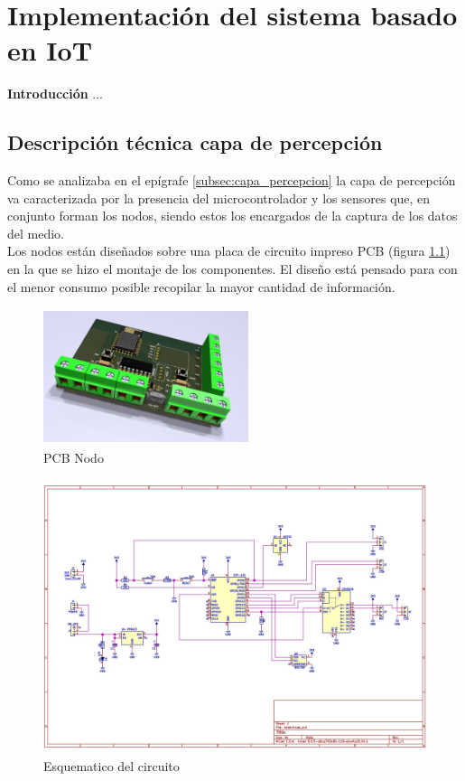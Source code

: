 \chapter{Implementación del sistema basado en IoT}\label{cap: }

        \textbf{\Large Introducción}\newline
        ...

\section{Descripción técnica capa de percepción}

Como se analizaba en el epígrafe \ref{subsec:capa_percepcion} la capa de percepción va caracterizada por la presencia del microcontrolador y los sensores que, en conjunto forman los nodos, siendo estos los
encargados de la captura de los datos del medio.\\

Los nodos están diseñados sobre una placa de circuito impreso PCB (figura \ref{imag:pcb_nodo}) en la que se hizo el montaje de los componentes.
El diseño está pensado para con el menor consumo posible recopilar la mayor cantidad de información.

\begin{figure}[H]
    \centering
    \includegraphics[width=6cm, height=4cm]{imagenes/vista 3D.jpg}
    \caption{PCB Nodo}
    \label{imag:pcb_nodo}
\end{figure}

\begin{figure}[H]
    \centering
    \includegraphics[width=12cm, height=8cm]{imagenes/esquematico nodo.jpg}
    \caption{Esquematico del circuito}
    \label{imag:esquematico_nodo}
\end{figure}

